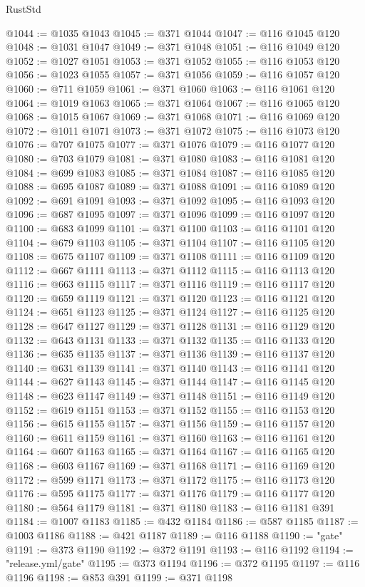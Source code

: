 \begin{lexlean}{RustStd}
\begin{coremodule}
@1044 := @1035 @1043
@1045 := @371 @1044
@1047 := @116 @1045 @120
@1048 := @1031 @1047
@1049 := @371 @1048
@1051 := @116 @1049 @120
@1052 := @1027 @1051
@1053 := @371 @1052
@1055 := @116 @1053 @120
@1056 := @1023 @1055
@1057 := @371 @1056
@1059 := @116 @1057 @120
@1060 := @711 @1059
@1061 := @371 @1060
@1063 := @116 @1061 @120
@1064 := @1019 @1063
@1065 := @371 @1064
@1067 := @116 @1065 @120
@1068 := @1015 @1067
@1069 := @371 @1068
@1071 := @116 @1069 @120
@1072 := @1011 @1071
@1073 := @371 @1072
@1075 := @116 @1073 @120
@1076 := @707 @1075
@1077 := @371 @1076
@1079 := @116 @1077 @120
@1080 := @703 @1079
@1081 := @371 @1080
@1083 := @116 @1081 @120
@1084 := @699 @1083
@1085 := @371 @1084
@1087 := @116 @1085 @120
@1088 := @695 @1087
@1089 := @371 @1088
@1091 := @116 @1089 @120
@1092 := @691 @1091
@1093 := @371 @1092
@1095 := @116 @1093 @120
@1096 := @687 @1095
@1097 := @371 @1096
@1099 := @116 @1097 @120
@1100 := @683 @1099
@1101 := @371 @1100
@1103 := @116 @1101 @120
@1104 := @679 @1103
@1105 := @371 @1104
@1107 := @116 @1105 @120
@1108 := @675 @1107
@1109 := @371 @1108
@1111 := @116 @1109 @120
@1112 := @667 @1111
@1113 := @371 @1112
@1115 := @116 @1113 @120
@1116 := @663 @1115
@1117 := @371 @1116
@1119 := @116 @1117 @120
@1120 := @659 @1119
@1121 := @371 @1120
@1123 := @116 @1121 @120
@1124 := @651 @1123
@1125 := @371 @1124
@1127 := @116 @1125 @120
@1128 := @647 @1127
@1129 := @371 @1128
@1131 := @116 @1129 @120
@1132 := @643 @1131
@1133 := @371 @1132
@1135 := @116 @1133 @120
@1136 := @635 @1135
@1137 := @371 @1136
@1139 := @116 @1137 @120
@1140 := @631 @1139
@1141 := @371 @1140
@1143 := @116 @1141 @120
@1144 := @627 @1143
@1145 := @371 @1144
@1147 := @116 @1145 @120
@1148 := @623 @1147
@1149 := @371 @1148
@1151 := @116 @1149 @120
@1152 := @619 @1151
@1153 := @371 @1152
@1155 := @116 @1153 @120
@1156 := @615 @1155
@1157 := @371 @1156
@1159 := @116 @1157 @120
@1160 := @611 @1159
@1161 := @371 @1160
@1163 := @116 @1161 @120
@1164 := @607 @1163
@1165 := @371 @1164
@1167 := @116 @1165 @120
@1168 := @603 @1167
@1169 := @371 @1168
@1171 := @116 @1169 @120
@1172 := @599 @1171
@1173 := @371 @1172
@1175 := @116 @1173 @120
@1176 := @595 @1175
@1177 := @371 @1176
@1179 := @116 @1177 @120
@1180 := @564 @1179
@1181 := @371 @1180
@1183 := @116 @1181 @391
@1184 := @1007 @1183
@1185 := @432 @1184
@1186 := @587 @1185
@1187 := @1003 @1186
@1188 := @421 @1187
@1189 := @116 @1188
@1190 := "gate"
@1191 := @373 @1190
@1192 := @372 @1191
@1193 := @116 @1192
@1194 := "release.yml/gate"
@1195 := @373 @1194
@1196 := @372 @1195
@1197 := @116 @1196
@1198 := @853 @391
@1199 := @371 @1198

\end{coremodule}
\end{lexlean}
